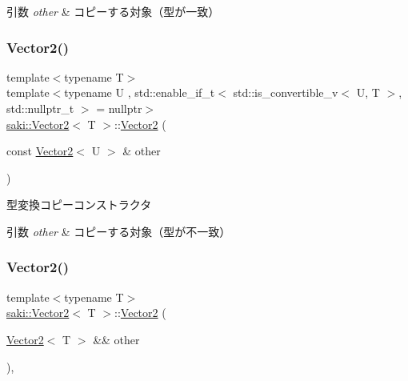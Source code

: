 \begin{DoxyParams}{引数}
{\em other} & コピーする対象（型が一致） \\
\hline
\end{DoxyParams}
\mbox{\label{classsaki_1_1_vector2_a42b53654af45a1ab8f5591c3168092a6}} 
\subsubsection{\texorpdfstring{Vector2()}{Vector2()}\hspace{0.1cm}{\footnotesize\ttfamily [5/7]}}
{\footnotesize\ttfamily template$<$typename T$>$ \\
template$<$typename U , std\+::enable\+\_\+if\+\_\+t$<$ std\+::is\+\_\+convertible\+\_\+v$<$ U, T $>$, std\+::nullptr\+\_\+t $>$  = nullptr$>$ \\
\mbox{\hyperlink{classsaki_1_1_vector2}{saki\+::\+Vector2}}$<$ T $>$\+::\mbox{\hyperlink{classsaki_1_1_vector2}{Vector2}} (\begin{DoxyParamCaption}\item[{const \mbox{\hyperlink{classsaki_1_1_vector2}{Vector2}}$<$ U $>$ \&}]{other }\end{DoxyParamCaption})\hspace{0.3cm}{\ttfamily [inline]}}



型変換コピーコンストラクタ 


\begin{DoxyParams}{引数}
{\em other} & コピーする対象（型が不一致） \\
\hline
\end{DoxyParams}
\mbox{\label{classsaki_1_1_vector2_a770b0d8588ea98ac88a35ba46657cc6d}} 
\subsubsection{\texorpdfstring{Vector2()}{Vector2()}\hspace{0.1cm}{\footnotesize\ttfamily [6/7]}}
{\footnotesize\ttfamily template$<$typename T$>$ \\
\mbox{\hyperlink{classsaki_1_1_vector2}{saki\+::\+Vector2}}$<$ T $>$\+::\mbox{\hyperlink{classsaki_1_1_vector2}{Vector2}} (\begin{DoxyParamCaption}\item[{\mbox{\hyperlink{classsaki_1_1_vector2}{Vector2}}$<$ T $>$ \&\&}]{other }\end{DoxyParamCaption})\hspace{0.3cm}{\ttfamily [inline]}, {\ttfamily [noexcept]}}



